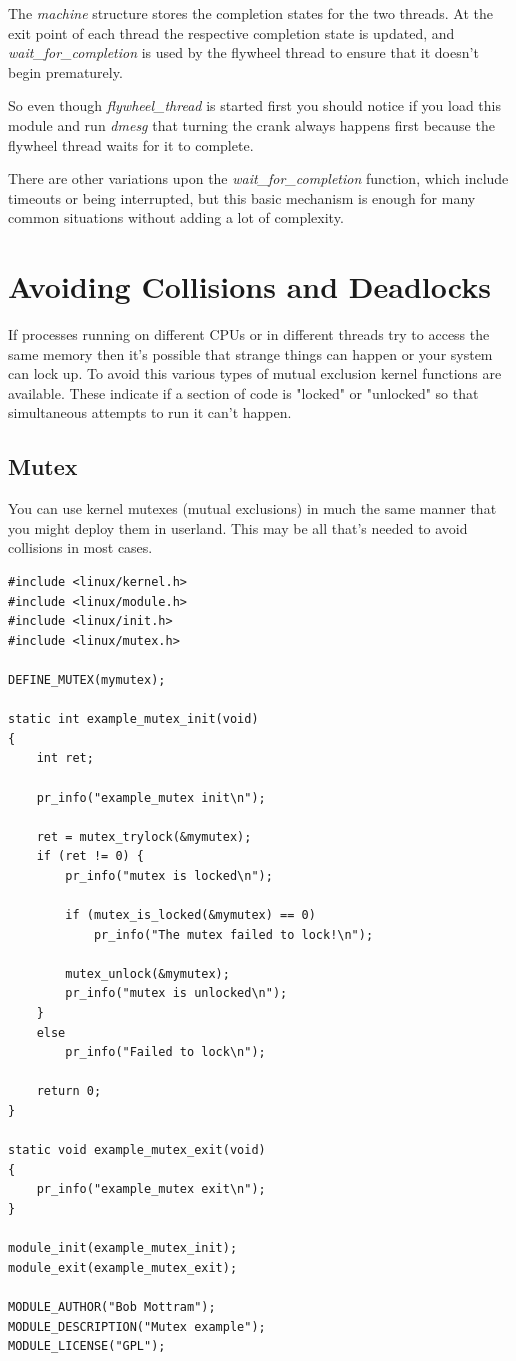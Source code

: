 \documentclass[11pt]{article}
\begin{document}
The \emph{machine} structure stores the completion states for the two threads. At the exit point of each thread the respective completion state is updated, and \emph{wait\_for\_completion} is used by the flywheel thread to ensure that it doesn't begin prematurely.

So even though \emph{flywheel\_thread} is started first you should notice if you load this module and run \emph{dmesg} that turning the crank always happens first because the flywheel thread waits for it to complete.

There are other variations upon the \emph{wait\_for\_completion} function, which include timeouts or being interrupted, but this basic mechanism is enough for many common situations without adding a lot of complexity.

\section*{Avoiding Collisions and Deadlocks}
\label{sec:org694d9ba}
If processes running on different CPUs or in different threads try to access the same memory then it's possible that strange things can happen or your system can lock up. To avoid this various types of mutual exclusion kernel functions are available. These indicate if a section of code is "locked" or "unlocked" so that simultaneous attempts to run it can't happen.
\subsection*{Mutex}
\label{sec:org2f84012}
You can use kernel mutexes (mutual exclusions) in much the same manner that you might deploy them in userland. This may be all that's needed to avoid collisions in most cases.

\begin{verbatim}
#include <linux/kernel.h>
#include <linux/module.h>
#include <linux/init.h>
#include <linux/mutex.h>

DEFINE_MUTEX(mymutex);

static int example_mutex_init(void)
{
    int ret;

    pr_info("example_mutex init\n");

    ret = mutex_trylock(&mymutex);
    if (ret != 0) {
        pr_info("mutex is locked\n");

        if (mutex_is_locked(&mymutex) == 0)
            pr_info("The mutex failed to lock!\n");

        mutex_unlock(&mymutex);
        pr_info("mutex is unlocked\n");
    }
    else
        pr_info("Failed to lock\n");

    return 0;
}

static void example_mutex_exit(void)
{
    pr_info("example_mutex exit\n");
}

module_init(example_mutex_init);
module_exit(example_mutex_exit);

MODULE_AUTHOR("Bob Mottram");
MODULE_DESCRIPTION("Mutex example");
MODULE_LICENSE("GPL");
\end{verbatim}
\end{document}
